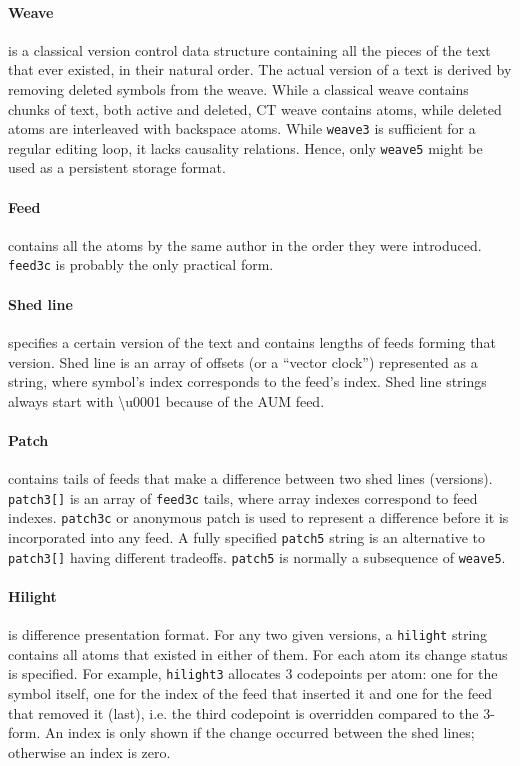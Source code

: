 \documentclass{acm_proc_article-sp}
\begin{document}
\paragraph{Weave} is a classical version control data structure containing all the pieces of the
   text that ever existed, in their natural order. The actual version
   of a text is derived by removing deleted symbols from the weave.
   While a classical weave contains chunks of text, both active and
   deleted, CT weave contains atoms, while deleted atoms are interleaved
   with backspace atoms.
   While {\tt weave3} is sufficient for a regular editing loop, 
   it lacks causality relations. Hence, only {\tt weave5} might
   be used as a persistent storage format.
\paragraph{Feed} contains all the atoms by the same author in the order they were introduced. {\tt feed3c} is probably the only practical form.
\paragraph{Shed line} specifies a certain version of the text and contains lengths of feeds forming that version. Shed line is an array of offsets (or a ``vector clock'') represented as a string, where symbol's index corresponds to the feed's index. Shed line strings always start with \textbackslash u0001 because of the AUM feed.
\paragraph{Patch} contains tails of feeds that make a difference between two shed lines (versions). {\tt patch3[]} is an array of {\tt feed3c} tails, where array indexes correspond to feed indexes. {\tt patch3c} or anonymous patch is used to represent a difference before it is incorporated into any feed. A fully specified {\tt patch5} string is an alternative to {\tt patch3[]} having different tradeoffs.
{\tt patch5} is normally a subsequence of {\tt weave5}.
\paragraph{Hilight} is difference presentation format. For any two given versions, a {\tt hilight} string contains all atoms that existed in either of them. For each atom its change status is specified.  For example, {\tt hilight3} allocates 3 codepoints per atom: one for the symbol itself, one for the index of the feed that inserted it and one for the feed that removed it (last), i.e. the third codepoint is overridden compared to the 3-form. An index is only shown if the change occurred between the shed lines; otherwise an index is zero.
\end{document}
